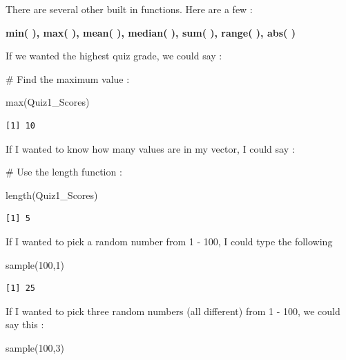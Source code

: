 \documentclass[
  letterpaper,
  DIV=11,
  numbers=noendperiod]{scrreprt}
\newenvironment{Shaded}{\begin{snugshade}}{\end{snugshade}}
\newcommand{\CommentTok}[1]{\textcolor[rgb]{0.37,0.37,0.37}{#1}}
\newcommand{\DecValTok}[1]{\textcolor[rgb]{0.68,0.00,0.00}{#1}}
\newcommand{\FunctionTok}[1]{\textcolor[rgb]{0.28,0.35,0.67}{#1}}
\newcommand{\NormalTok}[1]{\textcolor[rgb]{0.00,0.23,0.31}{#1}}
\begin{document}
There are several other built in functions. Here are a few :

\textbf{min( ), max( ), mean( ), median( ), sum( ), range( ), abs( )}

If we wanted the highest quiz grade, we could say :

\begin{Shaded}
\begin{Highlighting}[]
\CommentTok{\# Find the maximum value :}

\FunctionTok{max}\NormalTok{(Quiz1\_Scores)}
\end{Highlighting}
\end{Shaded}

\begin{verbatim}
[1] 10
\end{verbatim}

If I wanted to know how many values are in my vector, I could say :

\begin{Shaded}
\begin{Highlighting}[]
\CommentTok{\# Use the length function :}

\FunctionTok{length}\NormalTok{(Quiz1\_Scores)}
\end{Highlighting}
\end{Shaded}

\begin{verbatim}
[1] 5
\end{verbatim}

If I wanted to pick a random number from 1 - 100, I could type the
following

\begin{Shaded}
\begin{Highlighting}[]
\FunctionTok{sample}\NormalTok{(}\DecValTok{100}\NormalTok{,}\DecValTok{1}\NormalTok{)}
\end{Highlighting}
\end{Shaded}

\begin{verbatim}
[1] 25
\end{verbatim}

If I wanted to pick three random numbers (all different) from 1 - 100,
we could say this :

\begin{Shaded}
\begin{Highlighting}[]
\FunctionTok{sample}\NormalTok{(}\DecValTok{100}\NormalTok{,}\DecValTok{3}\NormalTok{)}
\end{Highlighting}
\end{Shaded}
\end{document}
